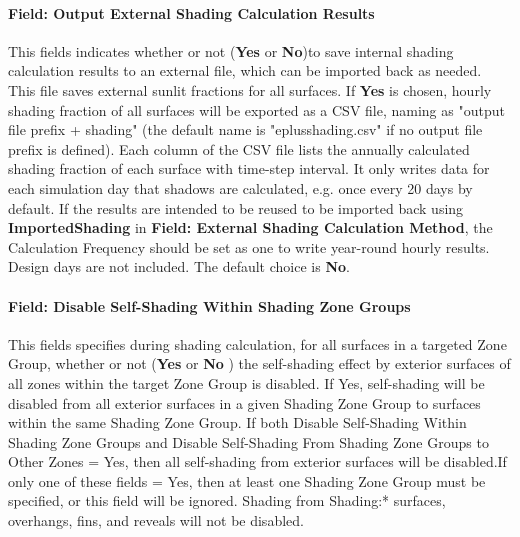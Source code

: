\paragraph{Field: Output External Shading Calculation Results}\label{field-output-external-shading-calculation results}
This fields indicates whether or not (\textbf{Yes} or \textbf{No})to save internal shading calculation results to an external file, which can be imported back as needed. This file saves external sunlit fractions for all surfaces. If \textbf{Yes} is chosen, hourly shading fraction of all surfaces will be exported as a CSV file, naming as "output file prefix + shading" (the default name is "eplusshading.csv" if no output file prefix is defined). Each column of the CSV file lists the annually calculated shading fraction of each surface with time-step interval. It only writes data for each simulation day that shadows are calculated, e.g. once every 20 days by default. If the results are intended to be reused to be imported  back using \textbf{ImportedShading} in \textbf{Field: External Shading Calculation Method}, the Calculation Frequency should be set as one to write year-round hourly results. Design days are not included. The default choice is \textbf{No}.

\paragraph{Field: Disable Self-Shading Within Shading Zone Groups}\label{fieldself--disable-shading-within-a-zone-group}
This fields specifies during shading calculation, for all surfaces in a targeted Zone Group, whether or not (\textbf{Yes} or \textbf{No} ) the self-shading effect by exterior surfaces of all zones within the target Zone Group is disabled. If Yes, self-shading will be disabled from all exterior surfaces in a given Shading Zone Group to surfaces within the same Shading Zone Group. If both Disable Self-Shading Within Shading Zone Groups and Disable Self-Shading From Shading Zone Groups to Other Zones = Yes, then all self-shading from exterior surfaces will be disabled.If only one of these fields = Yes, then at least one Shading Zone Group must be specified, or this field will be ignored. Shading from Shading:* surfaces, overhangs, fins, and reveals will not be disabled.

